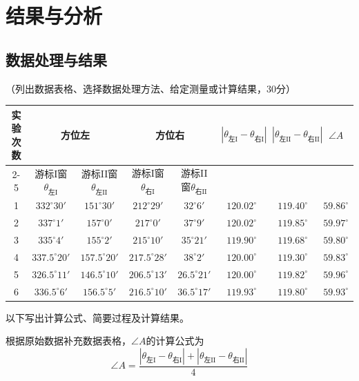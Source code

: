 \documentclass[10pt,a4paper]{ctexart}
\newcommand{\xiaosi}{\fontsize{12pt}{16pt}\selectfont}
\begin{document}
\section{结果与分析}

    \subsection{数据处理与结果}
    \xiaosi （列出数据表格、选择数据处理方法、给定测量或计算结果，30分）

    \small{
\begin{tabular}{|c|c|c|c|c|c|c|c|}
\hline
\multirow{2}{*}{实验次数} & \multicolumn{2}{c|}{方位左} & \multicolumn{2}{c|}{方位右} & \multirow{2}{*}{$\left|\theta_{\text{左I}} - \theta_{\text{右I}}\right|$} & \multirow{2}{*}{$\left|\theta_{\text{左II}} - \theta_{\text{右II}}\right|$} & \multirow{2}{*}{$\angle A$} \\
\cline{2-5}
& 游标I窗$\theta_{\text{左I}}$ & 游标II窗$\theta_{\text{左II}}$  & 游标I窗$\theta_{\text{右I}}$ & 游标II窗$\theta_{\text{右II}}$ &  &  &  \\
\hline
1 & $332^\circ 30'$ & $151^\circ 30'$ & $212^\circ 29'$ & $32^\circ 6'$ & $120.02^\circ$ & $119.40^\circ$ & $59.86^\circ$ \\
\hline
2 & $337^\circ 1'$ & $157^\circ 0'$ & $217^\circ 0'$ & $37^\circ 9'$ & $120.02^\circ$ & $119.85^\circ$ & $59.97^\circ$ \\
\hline
3 & $335^\circ 4'$ & $155^\circ 2'$ & $215^\circ 10'$ & $35^\circ 21'$ & $119.90^\circ$ & $119.68^\circ$ & $59.80^\circ$ \\
\hline
4 & $337.5^\circ 20'$ & $157.5^\circ 20'$ & $217.5^\circ 28'$ & $38^\circ 2'$ & $120.00^\circ$ & $119.30^\circ$ & $59.83^\circ$ \\
\hline
5 & $326.5^\circ 11'$ & $146.5^\circ 10'$ & $206.5^\circ 13'$ & $26.5^\circ 21'$ & $120.00^\circ$ & $119.82^\circ$ & $59.96^\circ$ \\
\hline
6 & $336.5^\circ 6'$ & $156.5^\circ 5'$ & $216.5^\circ 10'$ & $36.5^\circ 17'$ & $119.93^\circ$ & $119.80^\circ$ & $59.93^\circ$ \\
\hline
\end{tabular}
}

    以下写出计算公式、简要过程及计算结果。

    根据原始数据补充数据表格，$\angle A$的计算公式为
  \begin{equation}
    \angle A = \frac{\left|\theta_{\text{左I}} - \theta_{\text{右I}}\right| + \left|\theta_{\text{左II}} - \theta_{\text{右II}}\right|}{4}
\end{equation}
\end{document}
